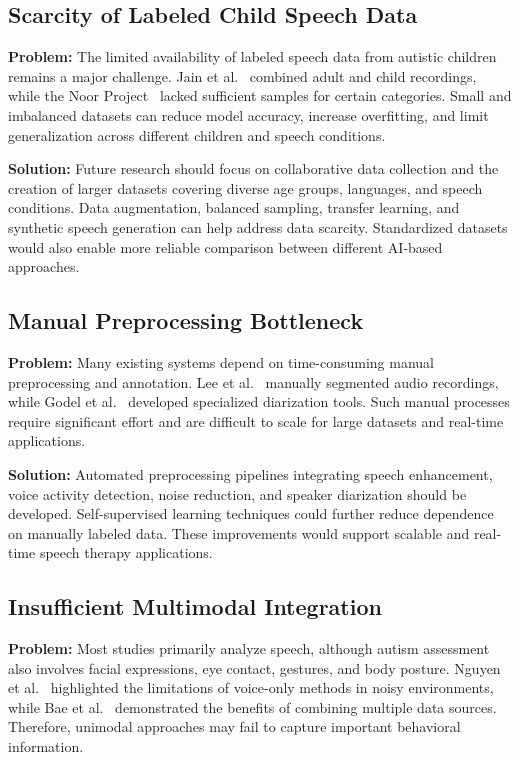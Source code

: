 \documentclass[conference]{IEEEtran}
\begin{document}
\subsection{Scarcity of Labeled Child Speech Data}

\textbf{Problem:} The limited availability of labeled speech data from autistic children remains a major challenge. Jain et al.~\cite{ref1} combined adult and child recordings, while the Noor Project~\cite{ref3} lacked sufficient samples for certain categories. Small and imbalanced datasets can reduce model accuracy, increase overfitting, and limit generalization across different children and speech conditions.

\textbf{Solution:} Future research should focus on collaborative data collection and the creation of larger datasets covering diverse age groups, languages, and speech conditions. Data augmentation, balanced sampling, transfer learning, and synthetic speech generation can help address data scarcity. Standardized datasets would also enable more reliable comparison between different AI-based approaches.

\subsection{Manual Preprocessing Bottleneck}

\textbf{Problem:} Many existing systems depend on time-consuming manual preprocessing and annotation. Lee et al.~\cite{ref2} manually segmented audio recordings, while Godel et al.~\cite{ref7} developed specialized diarization tools. Such manual processes require significant effort and are difficult to scale for large datasets and real-time applications.

\textbf{Solution:} Automated preprocessing pipelines integrating speech enhancement, voice activity detection, noise reduction, and speaker diarization should be developed. Self-supervised learning techniques could further reduce dependence on manually labeled data. These improvements would support scalable and real-time speech therapy applications.

\subsection{Insufficient Multimodal Integration}

\textbf{Problem:} Most studies primarily analyze speech, although autism assessment also involves facial expressions, eye contact, gestures, and body posture. Nguyen et al.~\cite{ref18} highlighted the limitations of voice-only methods in noisy environments, while Bae et al.~\cite{ref10} demonstrated the benefits of combining multiple data sources. Therefore, unimodal approaches may fail to capture important behavioral information.
\end{document}
